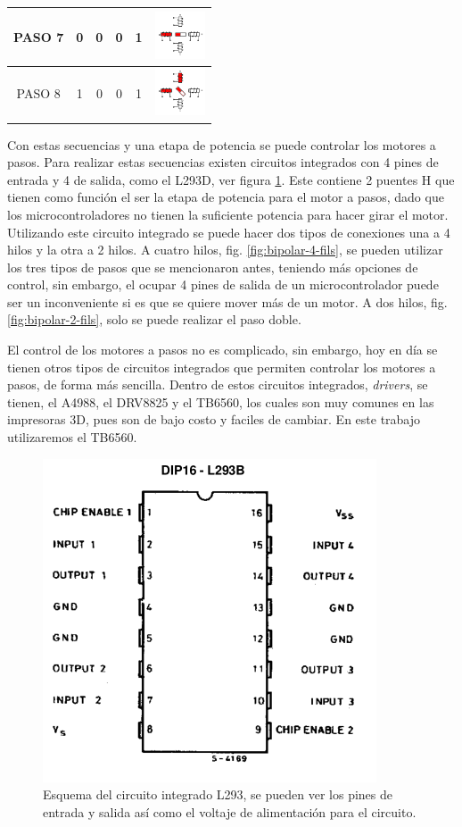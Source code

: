 \begin{table}
\begin{tabular}{|c|c|c|c|c|p{2cm}|}
		\hline 
		PASO 7 & 0 & 0 & 0 & 1 & \includegraphics[width=15mm]{Imagenes/2/paso4} \\ 
		\hline 
		PASO 8  & 1 & 0 & 0 & 1 & \includegraphics[width=15mm]{Imagenes/2/paso4_5} \\ 
		\hline 
	\end{tabular} 
\end{table}

Con estas secuencias y una etapa de potencia se puede controlar los motores a pasos. Para realizar estas secuencias existen circuitos integrados con 4 pines de entrada y 4 de salida, como el L293D, ver figura \ref{fig:l293}. Este contiene 2 puentes H que tienen como función el ser la etapa de potencia para el motor a pasos, dado que los microcontroladores no tienen la suficiente potencia para hacer girar el motor.
Utilizando este circuito integrado se puede hacer dos tipos de conexiones una a 4 hilos y la otra a 2 hilos. A cuatro hilos, fig. \ref{fig:bipolar-4-fils}, se pueden utilizar los tres tipos de pasos que se mencionaron antes, teniendo más opciones de control, sin embargo, el ocupar 4 pines de salida de un microcontrolador puede ser un inconveniente si es que se quiere mover más de un motor. A dos hilos, fig. \ref{fig:bipolar-2-fils}, solo se puede realizar el paso doble. %

El control de los motores a pasos no es complicado, sin embargo, hoy en día se tienen otros tipos de circuitos integrados que permiten controlar los motores a pasos, de forma más sencilla. Dentro de estos circuitos integrados, \textit{drivers}, se tienen, el A4988, el DRV8825 y el TB6560, los cuales son muy comunes en las impresoras 3D, pues son de bajo costo y faciles de cambiar. En este trabajo utilizaremos el TB6560.
\begin{figure}[h]
	\centering
	\includegraphics[width=0.4\linewidth]{Imagenes/2/L293}
	\caption[Esquema del circuito integrado L293]{Esquema del circuito integrado L293, se pueden ver los pines de entrada y salida así como el voltaje de alimentación para el circuito. \cite{L2931986}}
	\label{fig:l293}
\end{figure}

